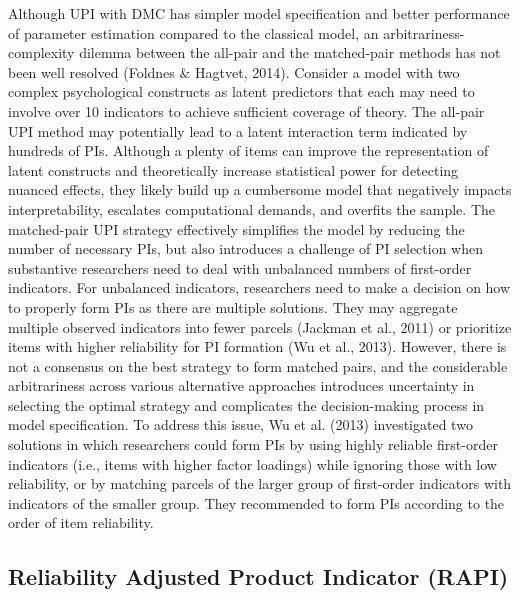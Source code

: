 \documentclass[
  man]{apa6}
\begin{document}
Although UPI with DMC has simpler model specification and better performance of parameter estimation compared to the classical model, an arbitrariness-complexity dilemma between the all-pair and the matched-pair methods has not been well resolved (Foldnes \& Hagtvet, 2014). Consider a model with two complex psychological constructs as latent predictors that each may need to involve over 10 indicators to achieve sufficient coverage of theory. The all-pair UPI method may potentially lead to a latent interaction term indicated by hundreds of PIs. Although a plenty of items can improve the representation of latent constructs and theoretically increase statistical power for detecting nuanced effects, they likely build up a cumbersome model that negatively impacts interpretability, escalates computational demands, and overfits the sample. The matched-pair UPI strategy effectively simplifies the model by reducing the number of necessary PIs, but also introduces a challenge of PI selection when substantive researchers need to deal with unbalanced numbers of first-order indicators. For unbalanced indicators, researchers need to make a decision on how to properly form PIs as there are multiple solutions. They may aggregate multiple observed indicators into fewer parcels (Jackman et al., 2011) or prioritize items with higher reliability for PI formation (Wu et al., 2013). However, there is not a consensus on the best strategy to form matched pairs, and the considerable arbitrariness across various alternative approaches introduces uncertainty in selecting the optimal strategy and complicates the decision-making process in model specification. To address this issue, Wu et al. (2013) investigated two solutions in which researchers could form PIs by using highly reliable first-order indicators (i.e., items with higher factor loadings) while ignoring those with low reliability, or by matching parcels of the larger group of first-order indicators with indicators of the smaller group. They recommended to form PIs according to the order of item reliability.

\hypertarget{reliability-adjusted-product-indicator-rapi}{%
\subsection{Reliability Adjusted Product Indicator (RAPI)}\label{reliability-adjusted-product-indicator-rapi}}
\end{document}
